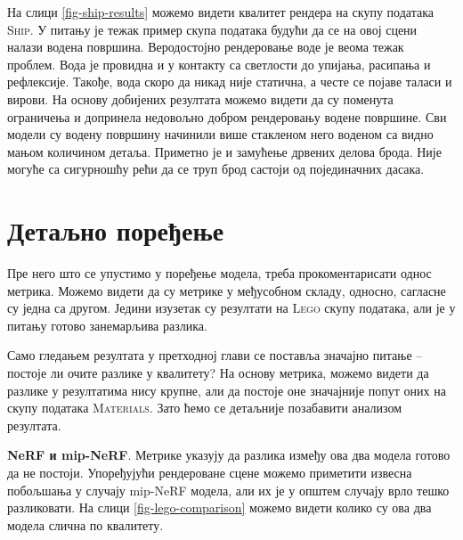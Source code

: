 \documentclass[12pt, a4paper, twoside]{book}
\numberwithin{equation}{chapter}
\numberwithin{theorem}{section}
\numberwithin{definition}{section}
\numberwithin{definitionChapter}{chapter}
\begin{document}
На слици \ref{fig-ship-results} можемо видети квалитет рендера на скупу података \textsc{Ship}.
У питању је тежак пример скупа података будући да се на овој сцени налази водена површина.
Веродостојно рендеровање воде је веома тежак проблем. Вода је провидна и у контакту са светлости
до упијања, расипања и рефлексије. Такође, вода скоро да никад није статична, а честе се појаве
таласи и вирови. На основу добијених резултата можемо видети да су поменута ограничења
и допринела недовољно добром рендеровању водене површине. Сви модели су водену површину начинили више
стакленом него воденом са видно мањом количином детаља. Приметно је и замућење дрвених делова брода.
Није могуће са сигурношћу рећи да се труп брод састоји од појединачних дасака.


\section{Детаљно поређење}
Пре него што се упустимо у поређење модела, треба прокоментарисати однос метрика. Можемо видети да су метрике у 
међусобном складу, односно, сагласне су једна са другом. Једини изузетак су резултати на \textsc{Lego} скупу података,
али је у питању готово занемарљива разлика.

Само гледањем резултата у претходној глави се поставља значајно питање -- постоје ли очите разлике у квалитету?
На основу метрика, можемо видети да разлике у резултатима нису крупне, али да постоје оне значајније попут
оних на скупу података \textsc{Materials}. Зато ћемо се детаљније позабавити анализом резултата.

\textbf{NeRF и mip-NeRF}. Метрике указују да разлика између ова два модела готово да не постоји. Упоређујући рендероване
сцене можемо приметити извесна побољшања у случају mip-NeRF модела, али их је у општем случају врло тешко разликовати.
На слици \ref{fig-lego-comparison} можемо видети колико су ова два модела слична по квалитету.
\end{document}
